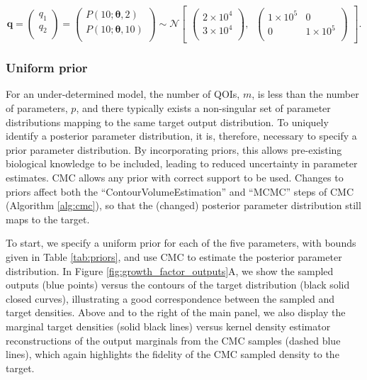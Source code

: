 \begin{equation}\label{eq:MM_outputDistribution}
\boldsymbol{q} =
\begin{pmatrix}
q_1\\
q_2\\
\end{pmatrix}
=
\begin{pmatrix}
P(10; \boldsymbol{\theta}, 2)\\
P(10; \boldsymbol{\theta}, 10)\\
\end{pmatrix} \sim  \mathcal{N}
\begin{bmatrix}
\begin{pmatrix}
2\times 10^4\\
3\times 10^4\\
\end{pmatrix}, \;\;
\begin{pmatrix}
1\times 10^5 & 0\\
0 & 1\times 10^5\\
\end{pmatrix}
\end{bmatrix}.
\end{equation}
%

\subsubsection{Uniform prior}\label{sec:growthmodel_uniform}
For an under-determined model, the number of QOIs, $m$, is less than the number of parameters, $p$, and there typically exists a non-singular set of parameter distributions mapping to the same target output distribution. To uniquely identify a posterior parameter distribution, it is, therefore, necessary to specify a prior parameter distribution. By incorporating priors, this allows pre-existing biological knowledge to be included, leading to reduced uncertainty in parameter estimates. CMC allows any prior with correct support to be used. Changes to priors affect both the ``ContourVolumeEstimation'' and ``MCMC'' steps of CMC (Algorithm \ref{alg:cmc}), so that the (changed) posterior parameter distribution still maps to the target.

To start, we specify a uniform prior for each of the five parameters, with bounds given in Table \ref{tab:priors}, and use CMC to estimate the posterior parameter distribution. In Figure \ref{fig:growth_factor_outputs}A, we show the sampled outputs (blue points) versus the contours of the target distribution (black solid closed curves), illustrating a good correspondence between the sampled and target densities. Above and to the right of the main panel, we also display the marginal target densities (solid black lines) versus kernel density estimator reconstructions of the output marginals from the CMC samples (dashed blue lines), which again highlights the fidelity of the CMC sampled density to the target.

